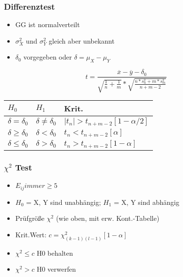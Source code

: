 \documentclass[a4paper]{article}
\begin{document}
\begin{landscape}
\begin{multicols}{4}
        \subsubsection*{Differenztest}
        \begin{itemize}[noitemsep,nolistsep,leftmargin=*]
            \item GG ist normalverteilt
            \item $\sigma^2_X$ und $\sigma^2_Y$ gleich aber unbekannt
            \item $\delta_0$ vorgegeben oder $\delta = \mu_X - \mu_Y$
        \end{itemize}
             $$t = \frac{\overline{x}-\overline{y}-\delta_0}{\sqrt{\frac{1}{n}+\frac{1}{m}}* \sqrt{\frac{n*s^2_n + m*s^2_m}{n+m-2}}}$$
        \begin{center}
                \begin{tabular}{|l|l|l|}
                \hline
                $H_0$ & $H_1$ & Krit. \\ \hline
                $\delta=\delta_0$      & $ \delta \neq \delta_0$ &   $|t_n| > t_{n+m-2}[1-\alpha/2]$    \\ \hline
                 $\delta \geq\delta_0$     & $\delta < \delta_0$  &  $t_n < t_{n+m-2}[\alpha]$     \\ \hline
                 $\delta \leq\delta_0$     &  $\delta > \delta_0$&   $t_n > t_{n+m-2}[1-\alpha]$    \\ \hline
                \end{tabular}
        \end{center}
        
        \subsubsection*{$\chi^2$ Test}
        \begin{itemize}[noitemsep,nolistsep,leftmargin=*]
            \item $E_{ij} immer  \geq 5$
            \item $H_0$ = X, Y sind unabhängig; $H_1$ = X, Y sind abhängig 
            \item Prüfgröße $\chi^2$ (wie oben, mit erw. Kont.-Tabelle)
            \item Krit.Wert: $c = \chi^2_{(k-1)(l-1)}[1-\alpha]$
            \item $\chi^2  \leq c$ H0 behalten
            \item $\chi^2 > c$ H0 verwerfen
        \end{itemize}

\end{multicols}
\end{landscape}
\end{document}
